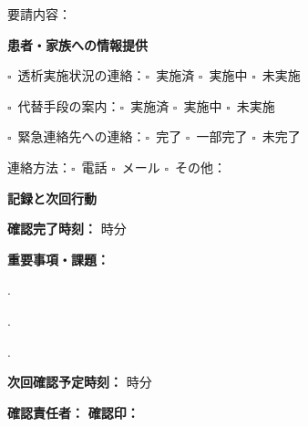 \documentclass[a4paper,12pt]{jarticle}
\newcommand{\checkbox}{$\square$\ }
\newcommand{\underlinespace}[1]{\underline{\hspace{#1}}}
\begin{document}
\vspace{2mm}

\noindent
要請内容：\underlinespace{10cm}

\vspace{8mm}

\begin{center}
\textbf{\large 患者・家族への情報提供}
\end{center}

\vspace{3mm}

\noindent
\checkbox 透析実施状況の連絡：\checkbox 実施済 \quad \checkbox 実施中 \quad \checkbox 未実施

\vspace{3mm}

\noindent
\checkbox 代替手段の案内：\checkbox 実施済 \quad \checkbox 実施中 \quad \checkbox 未実施

\vspace{3mm}

\noindent
\checkbox 緊急連絡先への連絡：\checkbox 完了 \quad \checkbox 一部完了 \quad \checkbox 未完了

\vspace{2mm}

\noindent
連絡方法：\checkbox 電話 \quad \checkbox メール \quad \checkbox その他：\underlinespace{4cm}

\vspace{8mm}

\begin{center}
\textbf{\large 記録と次回行動}
\end{center}

\vspace{3mm}

\noindent
\textbf{確認完了時刻：} \underlinespace{1cm}時\underlinespace{1cm}分

\vspace{3mm}

\noindent
\textbf{重要事項・課題：}

\vspace{2mm}

. \underlinespace{12cm}

\vspace{2mm}

. \underlinespace{12cm}

\vspace{2mm}

. \underlinespace{12cm}

\vspace{3mm}

\noindent
\textbf{次回確認予定時刻：} \underlinespace{1cm}時\underlinespace{1cm}分

\vspace{3mm}

\noindent
\textbf{確認責任者：} \underlinespace{4cm} \quad \textbf{確認印：} \underlinespace{3cm}
\end{document}
